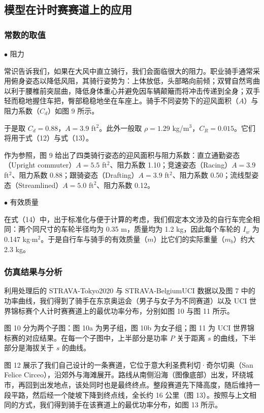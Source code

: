 \documentclass[11pt,a4paper]{ctexart}
\begin{document}
\subsection{模型在计时赛赛道上的应用}

\subsubsection{常数的取值}

$\bullet$ 阻力

常识告诉我们，如果在大风中直立骑行，我们会面临很大的阻力。职业骑手通常采用俯身姿态以降低风阻，其骑行姿势为：上体放低，头部略向前倾；双臂自然弯曲以利于腰椎前突屈曲，降低身体重心并避免因车辆颠簸而将冲击传递到全身；双手轻而稳地握住车把，臀部稳稳地坐在车座上。骑手不同姿势下的迎风面积（$A$）与阻力系数（$C_d$）如图 9 所示。

于是取 $C_d=0.88$，$A=3.9$ ft$^{2}$。此外一般取 $\rho=1.29$ kg/m$^{3}$，$C_R=0.015$。它们将用于式（12）与式（13）。

作为参照，图 9 给出了四类骑行姿态的迎风面积与阻力系数：直立通勤姿态（Upright commuter）$A=5.5$ ft$^{2}$、阻力系数 1.10；竞速姿态（Racing）$A=3.9$ ft$^{2}$、阻力系数 0.88；跟骑姿态（Drafting）$A=3.9$ ft$^{2}$、阻力系数 0.50；流线型姿态（Streamlined）$A=5.0$ ft$^{2}$、阻力系数 0.12。

$\bullet$ 有效质量

在式（14）中，出于标准化与便于计算的考虑，我们假定本文涉及的自行车完全相同：两个同尺寸的车轮半径均为 0.35 m，质量均为 1.2 kg，因此每个车轮的 $I_w$ 为 0.147 kg$\cdot$m$^{2}$。于是自行车与骑手的有效质量（$m$）比它们的实际重量（$m_b$）约大 2.3 kg。

\subsubsection{仿真结果与分析}

利用处理后的 STRAVA-Tokyo2020 与 STRAVA-BelgiumUCI 数据以及图 7 中的功率曲线，我们得到了骑手在东京奥运会（男子与女子为不同赛道）以及 UCI 世界锦标赛个人计时赛赛道上的最优功率分布，分别如图 10 与图 11 所示。

图 10 分为两个子图：图 10a 为男子组，图 10b 为女子组；图 11 为 UCI 世界锦标赛的对应结果。在每一个子图中，上半部分是功率 $P$ 关于距离 $s$ 的曲线，下半部分是海拔关于 $s$ 的曲线。

图 12 展示了我们自己设计的一条赛道，它位于意大利圣费利切·奇尔切奥（San Felice Circeo），沿郊外与海滩展开。路线从南侧沿海（图像底部）出发，环绕城市，再回到出发地点，该处同时也是最终终点。整段赛道先下降高度，随后维持一段平路，然后经一个陡坡下降到终点线，全长约 16 公里（图 13）。按照与上文相同的方式，我们得到骑手在该赛道上的最优功率分布，如图 13 所示。
\end{document}
